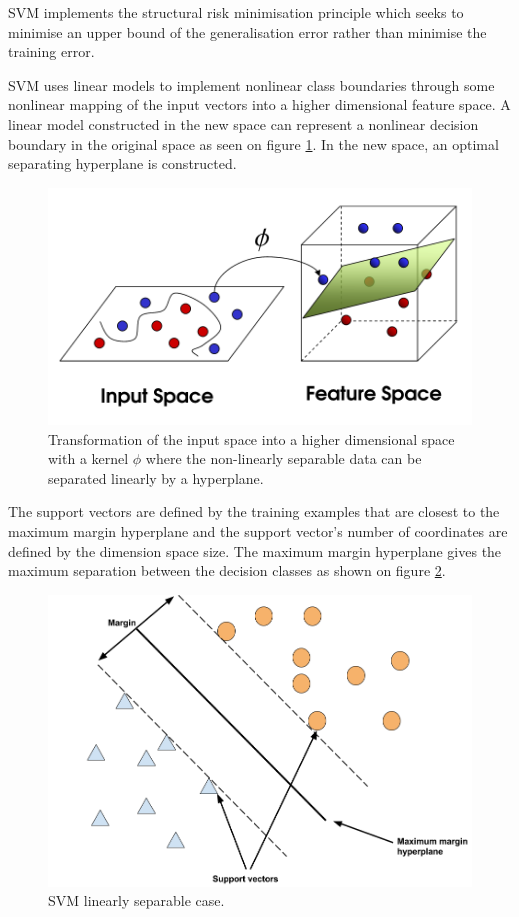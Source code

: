 \documentclass[11pt,a4paper,oneside]{book}
\begin{document}
SVM implements the structural risk minimisation principle which seeks to minimise an upper bound of the generalisation error rather than minimise the training error.

SVM uses linear models to implement nonlinear class boundaries through some nonlinear mapping of the input vectors into a higher dimensional feature space. A linear model constructed in the new space can represent a nonlinear decision boundary in the original space as seen on figure \ref{fig:svm}. In the new space, an optimal separating hyperplane is constructed. \cite{kim}\cite{liwang}\cite{Smola}


\begin{figure}[!h]
  \centering
    \includegraphics[scale=0.45]{img/svm.png}
  \caption{Transformation of the input space into a higher dimensional space with a kernel $\phi$ where the non-linearly separable data can be separated linearly by a hyperplane.}
  \label{fig:svm}
\end{figure}


The support vectors are defined by the training examples that are closest to the maximum margin hyperplane and the support vector's number of coordinates are defined by the dimension space size. The maximum margin hyperplane gives the maximum separation between the decision classes as shown on figure \ref{fig:svm_linear_sep}. 

\begin{figure}[!h]
  \centering
    \includegraphics[scale=0.3]{img/svm1.png}
  \caption{SVM linearly separable case.}
  \label{fig:svm_linear_sep}
\end{figure}
\end{document}
